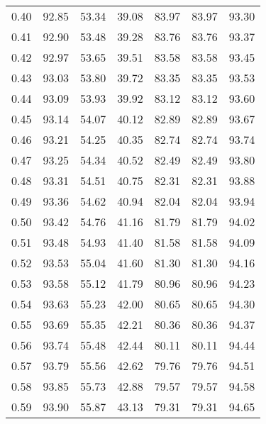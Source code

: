 \begin{tabular}{|c|c|c|c|c|c|c|}
      0.40 &     92.85 &     53.34 &      39.08 &   83.97 &      83.97 &         93.30 \\
      0.41 &     92.90 &     53.48 &      39.28 &   83.76 &      83.76 &         93.37 \\
      0.42 &     92.97 &     53.65 &      39.51 &   83.58 &      83.58 &         93.45 \\
      0.43 &     93.03 &     53.80 &      39.72 &   83.35 &      83.35 &         93.53 \\
      0.44 &     93.09 &     53.93 &      39.92 &   83.12 &      83.12 &         93.60 \\
      0.45 &     93.14 &     54.07 &      40.12 &   82.89 &      82.89 &         93.67 \\
      0.46 &     93.21 &     54.25 &      40.35 &   82.74 &      82.74 &         93.74 \\
      0.47 &     93.25 &     54.34 &      40.52 &   82.49 &      82.49 &         93.80 \\
      0.48 &     93.31 &     54.51 &      40.75 &   82.31 &      82.31 &         93.88 \\
      0.49 &     93.36 &     54.62 &      40.94 &   82.04 &      82.04 &         93.94 \\
      0.50 &     93.42 &     54.76 &      41.16 &   81.79 &      81.79 &         94.02 \\
      0.51 &     93.48 &     54.93 &      41.40 &   81.58 &      81.58 &         94.09 \\
      0.52 &     93.53 &     55.04 &      41.60 &   81.30 &      81.30 &         94.16 \\
      0.53 &     93.58 &     55.12 &      41.79 &   80.96 &      80.96 &         94.23 \\
      0.54 &     93.63 &     55.23 &      42.00 &   80.65 &      80.65 &         94.30 \\
      0.55 &     93.69 &     55.35 &      42.21 &   80.36 &      80.36 &         94.37 \\
      0.56 &     93.74 &     55.48 &      42.44 &   80.11 &      80.11 &         94.44 \\
      0.57 &     93.79 &     55.56 &      42.62 &   79.76 &      79.76 &         94.51 \\
      0.58 &     93.85 &     55.73 &      42.88 &   79.57 &      79.57 &         94.58 \\
      0.59 &     93.90 &     55.87 &      43.13 &   79.31 &      79.31 &         94.65 \\

\end{tabular}
